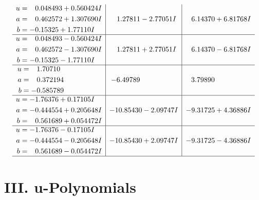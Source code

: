 \documentclass[1p]{elsarticle_modified}
\theoremstyle{definition}
\begin{document}
$$\begin{array}{c|c|c}
\begin{aligned}
u &= \phantom{-}0.048493 + 0.560424 I \\
a &= \phantom{-}0.462572 + 1.307690 I \\
b &= -0.15325 + 1.77110 I\end{aligned}
 & \phantom{-}1.27811 - 2.77051 I & \phantom{-}6.14370 + 6.81768 I \\ \hline\begin{aligned}
u &= \phantom{-}0.048493 - 0.560424 I \\
a &= \phantom{-}0.462572 - 1.307690 I \\
b &= -0.15325 - 1.77110 I\end{aligned}
 & \phantom{-}1.27811 + 2.77051 I & \phantom{-}6.14370 - 6.81768 I \\ \hline\begin{aligned}
u &= \phantom{-}1.70710\phantom{ +0.000000I} \\
a &= \phantom{-}0.372194\phantom{ +0.000000I} \\
b &= -0.585789\phantom{ +0.000000I}\end{aligned}
 & -6.49789\phantom{ +0.000000I} & \phantom{-}3.79890\phantom{ +0.000000I} \\ \hline\begin{aligned}
u &= -1.76376 + 0.17105 I \\
a &= -0.444554 + 0.205648 I \\
b &= \phantom{-}0.561689 + 0.054472 I\end{aligned}
 & -10.85430 - 2.09747 I & -9.31725 + 4.36886 I \\ \hline\begin{aligned}
u &= -1.76376 - 0.17105 I \\
a &= -0.444554 - 0.205648 I \\
b &= \phantom{-}0.561689 - 0.054472 I\end{aligned}
 & -10.85430 + 2.09747 I & -9.31725 - 4.36886 I\\
 \hline 
 \end{array}$$\newpage
\newpage\renewcommand{\arraystretch}{1}
\centering \section*{ III. u-Polynomials}
\end{document}
